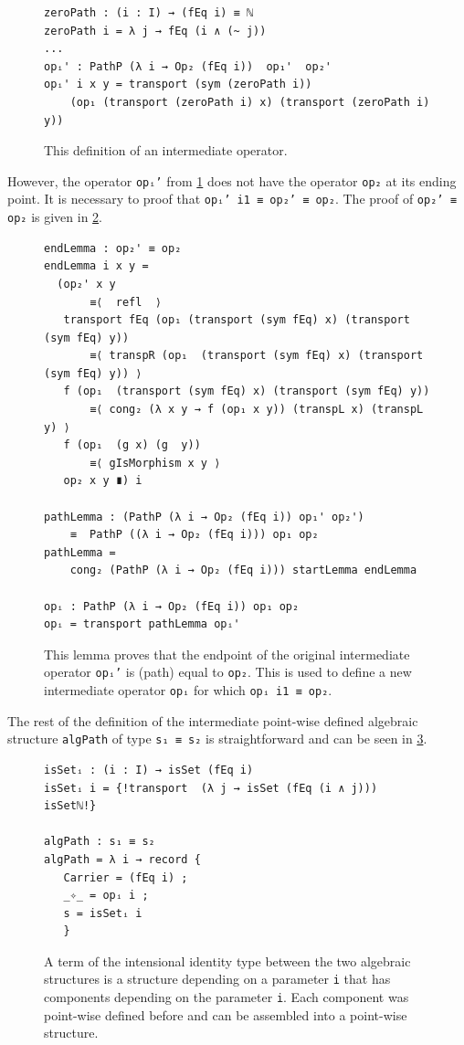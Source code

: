 \documentclass[12pt,a4paper,twoside,xetex]{book} %
\begin{document}
\begin{figure}\label{zeroPathLift}
\centering 
\begin{BVerbatim}
zeroPath : (i : I) → (fEq i) ≡ ℕ
zeroPath i = λ j → fEq (i ∧ (~ j))
...
opᵢ' : PathP (λ i → Op₂ (fEq i))  op₁'  op₂'
opᵢ' i x y = transport (sym (zeroPath i))
    (op₁ (transport (zeroPath i) x) (transport (zeroPath i) y))
\end{BVerbatim}
\caption{This definition of an intermediate operator.}

\end{figure}

However, the operator \texttt{opᵢ'} from \cref{zeroPathLift} does not have the operator \texttt{op₂} at its ending point. It is necessary to proof
that  \texttt{opᵢ' i1 ≡ op₂' ≡ op₂}. The proof of \texttt{op₂' ≡ op₂} is given in \cref{adaptedOp}.

\begin{figure}\label{adaptedOp}
 \centering
\begin{BVerbatim}
endLemma : op₂' ≡ op₂
endLemma i x y =
  (op₂' x y
       ≡⟨  refl  ⟩
   transport fEq (op₁ (transport (sym fEq) x) (transport (sym fEq) y))
       ≡⟨ transpR (op₁  (transport (sym fEq) x) (transport (sym fEq) y)) ⟩
   f (op₁  (transport (sym fEq) x) (transport (sym fEq) y))
       ≡⟨ cong₂ (λ x y → f (op₁ x y)) (transpL x) (transpL y) ⟩
   f (op₁  (g x) (g  y))
       ≡⟨ gIsMorphism x y ⟩
   op₂ x y ∎) i

pathLemma : (PathP (λ i → Op₂ (fEq i)) op₁' op₂') 
    ≡  PathP ((λ i → Op₂ (fEq i))) op₁ op₂
pathLemma = 
    cong₂ (PathP (λ i → Op₂ (fEq i))) startLemma endLemma

opᵢ : PathP (λ i → Op₂ (fEq i)) op₁ op₂
opᵢ = transport pathLemma opᵢ'
\end{BVerbatim}

\caption{This lemma proves that the endpoint of the original 
intermediate operator \texttt{opᵢ'} is (path) equal to
\texttt{op₂}. This is used to define a new intermediate operator 
\texttt{opᵢ} for which \texttt{opᵢ i1 ≡ op₂}.}   
\end{figure}

The rest of the definition of the intermediate point-wise defined algebraic 
structure \texttt{algPath} of type \texttt{s₁ ≡ s₂} is straightforward and can be seen in \cref{algpath}. 

\begin{figure}\label{algpath}
\centering
 \begin{BVerbatim}
isSetᵢ : (i : I) → isSet (fEq i)
isSetᵢ i = {!transport  (λ j → isSet (fEq (i ∧ j))) isSetℕ!} 

algPath : s₁ ≡ s₂
algPath = λ i → record {
   Carrier = (fEq i) ;
   _✧_ = opᵢ i ;
   s = isSetᵢ i
   }
 \end{BVerbatim}

 \caption{A term of the intensional identity type between the two algebraic 
structures is a structure depending on a parameter \texttt{i} that has 
components depending on the parameter \texttt{i}. Each component was point-wise 
defined before and can be assembled into a point-wise structure.}
\end{figure}
\end{document}
